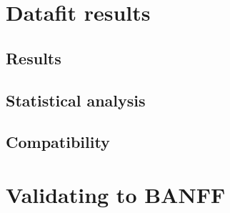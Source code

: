 \section{Datafit results}

\subsection{Results}

\subsection{Statistical analysis}

\subsection{Compatibility}

\section{Validating to BANFF}

